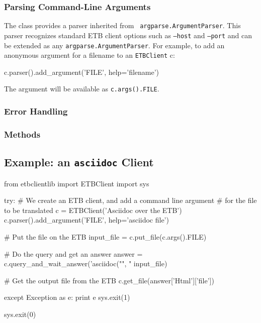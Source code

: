 \documentclass{article}
\begin{document}
\subsubsection{Parsing Command-Line Arguments}

The class provides a parser inherited from {\tt
  argparse.ArgumentParser}. This parser recognizes standard ETB client
options such as {\tt --host} and {\tt --port} and can be extended as
any {\tt argparse.ArgumentParser}. For example, to add an anonymous
argument for a filename to an {\tt ETBClient} c:
\begin{pythoncode}
    c.parser().add_argument('FILE', help='filename')
\end{pythoncode}
The argument will be available as {\tt c.args().FILE}.

\subsubsection{Error Handling}

\subsubsection{Methods}

\subsection{Example: an {\tt asciidoc} Client}

\begin{pythoncode}
from etbclientlib import ETBClient
import sys

try:
    # We create an ETB client, and add a command line argument
    # for the file to be translated
    c = ETBClient('Asciidoc over the ETB')
    c.parser().add_argument('FILE', help='asciidoc file')

    # Put the file on the ETB
    input_file = c.put_file(c.args().FILE)

    # Do the query and get an answer
    answer = c.query_and_wait_answer('asciidoc("", "%
                                     input_file)

    # Get the output file from the ETB
    c.get_file(answer['Html']['file'])

except Exception as e:
    print e
    sys.exit(1)

sys.exit(0)
\end{pythoncode}
\end{document}
